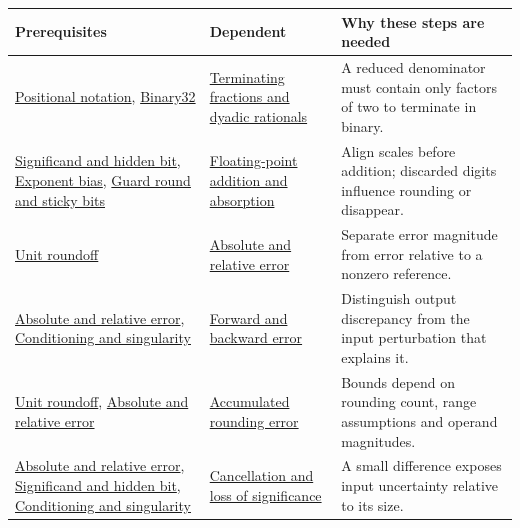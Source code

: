 {\def\LTcaptype{none} %
\begin{longtable}[]{@{}
  >{\raggedright\arraybackslash}p{}
  >{\raggedright\arraybackslash}p{}
  >{\raggedright\arraybackslash}p{}@{}}
\toprule\noalign{}
\begin{minipage}[b]{\linewidth}\raggedright
Prerequisites
\end{minipage} & \begin{minipage}[b]{\linewidth}\raggedright
Dependent
\end{minipage} & \begin{minipage}[b]{\linewidth}\raggedright
Why these steps are needed
\end{minipage} \\
\midrule\noalign{}
\endhead
\bottomrule\noalign{}
\endlastfoot
\hyperref[appendix-83c3f28f7bda]{Positional notation}, \hyperref[appendix-5057f9ad327f]{Binary32} & \hyperref[appendix-2a2f1b74bdd3]{Terminating fractions and dyadic rationals} & A reduced denominator must contain only factors of two to terminate in binary. \\
\hyperref[appendix-a24fd710cf67]{Significand and hidden bit}, \hyperref[appendix-2fae058c82e1]{Exponent bias}, \hyperref[appendix-b572b631069b]{Guard round and sticky bits} & \hyperref[appendix-a1b1b4580dfd]{Floating-point addition and absorption} & Align scales before addition; discarded digits influence rounding or disappear. \\
\hyperref[appendix-bc44f7b42f42]{Unit roundoff} & \hyperref[appendix-3ae74e89b4e6]{Absolute and relative error} & Separate error magnitude from error relative to a nonzero reference. \\
\hyperref[appendix-3ae74e89b4e6]{Absolute and relative error}, \hyperref[appendix-8f6a01f284a7]{Conditioning and singularity} & \hyperref[appendix-a7fbaf6d1b1c]{Forward and backward error} & Distinguish output discrepancy from the input perturbation that explains it. \\
\hyperref[appendix-bc44f7b42f42]{Unit roundoff}, \hyperref[appendix-3ae74e89b4e6]{Absolute and relative error} & \hyperref[appendix-f82e270791c8]{Accumulated rounding error} & Bounds depend on rounding count, range assumptions and operand magnitudes. \\
\hyperref[appendix-3ae74e89b4e6]{Absolute and relative error}, \hyperref[appendix-a24fd710cf67]{Significand and hidden bit}, \hyperref[appendix-8f6a01f284a7]{Conditioning and singularity} & \hyperref[appendix-a2773a6a2f9d]{Cancellation and loss of significance} & A small difference exposes input uncertainty relative to its size. \\

\end{longtable}}
